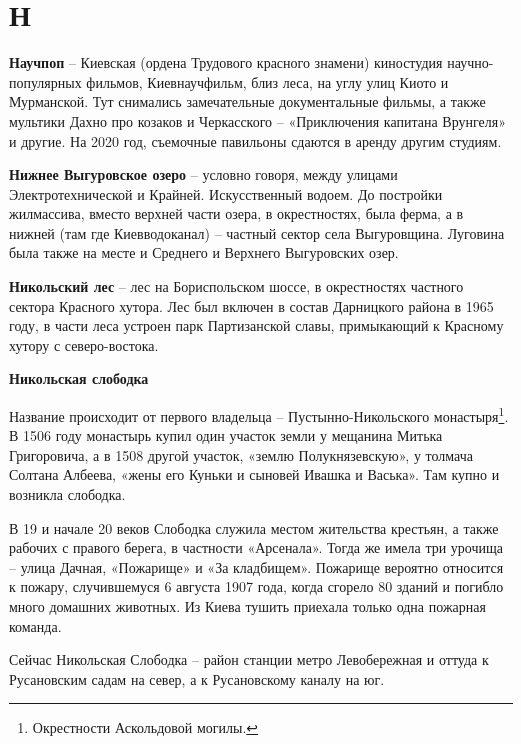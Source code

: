 \chapter*{Н}

\textbf{Научпоп} – Киевская (ордена Трудового красного знамени) киностудия научно-популярных фильмов, Киевнаучфильм, близ леса, на углу улиц Киото и Мурманской. Тут снимались замечательные документальные фильмы, а также мультики Дахно про козаков и Черкасского – «Приключения капитана Врунгеля» и другие. На 2020 год, съемочные павильоны сдаются в аренду другим студиям.\\

\medskip

\textbf{Нижнее Выгуровское озеро} – условно говоря, между улицами Электротехнической и Крайней. Искусственный водоем. До постройки жилмассива, вместо верхней части озера, в окрестностях, была ферма, а в нижней (там где Киевводоканал) – частный сектор села Выгуровщина. Луговина была также на месте и Среднего и Верхнего Выгуровских озер.\\

\medskip

\textbf{Никольский лес} – лес на Бориспольском шоссе, в окрестностях частного сектора Красного хутора. Лес был включен в состав Дарницкого района в 1965 году, в части леса устроен парк Партизанской славы, примыкающий к Красному хутору с северо-востока.\\

\medskip

\textbf{Никольская слободка}

Название происходит от первого владельца – Пустынно-Никольского монастыря\footnote{Окрестности Аскольдовой могилы.}. В 1506 году монастырь купил один участок земли у мещанина Митька Григоровича, а в 1508 другой участок, «землю Полукнязевскую», у толмача Солтана Албеева, «жены его Куньки и сыновей Ивашка и Васька». Там купно и возникла слободка.

В 19 и начале 20 веков Слободка служила местом жительства крестьян, а также рабочих с правого берега, в частности «Арсенала». Тогда же имела три урочища – улица Дачная, «Пожарище» и «За кладбищем». Пожарище вероятно относится к пожару, случившемуся 6 августа 1907 года, когда сгорело 80 зданий и погибло много домашних животных. Из Киева тушить приехала только одна пожарная команда.

Сейчас Никольская Слободка – район станции метро Левобережная и оттуда к Русановским садам на север, а к Русановскому каналу на юг.

